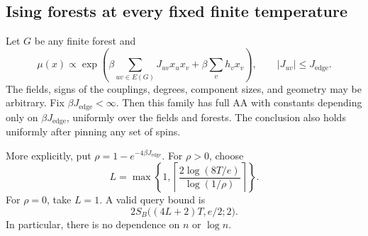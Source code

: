 \subsection{Ising forests at every fixed finite temperature}
\label{sec:threshold-positive-forests}

\begin{theorem}
\label{thm:threshold-ising-forests}
Let \(G\) be any finite forest and
\[
 \mu(x)\propto
 \exp\left(\beta\sum_{uv\in E(G)}J_{uv}x_ux_v
                 +\beta\sum_v h_vx_v\right),\qquad
 |J_{uv}|\le J_{\mathrm{edge}}.
\]
The fields, signs of the couplings, degrees, component sizes, and
geometry may be arbitrary. Fix \(\beta J_{\mathrm{edge}}<\infty\). Then this family
has full AA with constants depending only on \(\beta J_{\mathrm{edge}}\), uniformly
over the fields and forests. The conclusion also holds uniformly
after pinning any set of spins.

More explicitly, put \(\rho=1-e^{-4\beta J_{\mathrm{edge}}}\). For \(\rho>0\),
choose
\[
 L=\max\left\{1,
 \left\lceil\frac{2\log(8T/e)}{\log(1/\rho)}\right\rceil\right\}.
\]
For \(\rho=0\), take \(L=1\). A valid query bound is
\[
 2S_B\bigl((4L+2)T,e/2;2\bigr).
\]
In particular, there is no dependence on \(n\) or \(\log n\).
\end{theorem}

